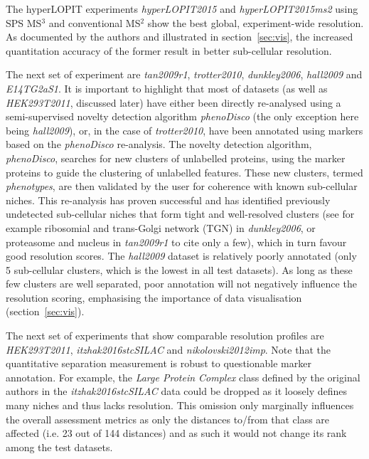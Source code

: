 \documentclass[12pt]{article}\usepackage[]{graphicx}\usepackage[]{color}
\begin{document}
The hyperLOPIT experiments \textit{hyperLOPIT2015} and
\textit{hyperLOPIT2015ms2} \citep{Christoforou:2016} using SPS MS$^3$
and conventional MS$^2$ show the best global, experiment-wide
resolution. As documented by the authors and illustrated in
section~\ref{sec:vis}, the increased quantitation accuracy of the
former result in better sub-cellular resolution.

The next set of experiment are \textit{tan2009r1},
\textit{trotter2010}, \textit{dunkley2006}, \textit{hall2009} and
\textit{E14TG2aS1}. It is important to highlight that most of datasets
(as well as \textit{HEK293T2011}, discussed later) have either been
directly re-analysed using a semi-supervised novelty detection
algorithm \textit{phenoDisco} \citep{Breckels:2013} (the only
exception here being \textit{hall2009}), or, in the case of
\textit{trotter2010}, have been annotated using markers based on the
\textit{phenoDisco} re-analysis. The novelty detection algorithm,
\textit{phenoDisco}, searches for new clusters of unlabelled proteins,
using the marker proteins to guide the clustering of unlabelled
features. These new clusters, termed \textit{phenotypes}, are then
validated by the user for coherence with known sub-cellular niches.
This re-analysis has proven successful \citep{Breckels:2013} and has
identified previously undetected sub-cellular niches that form tight
and well-resolved clusters (see for example ribosomial and trans-Golgi
network (TGN) in \textit{dunkley2006}, or proteasome and nucleus in
\textit{tan2009r1} to cite only a few), which in turn favour good
resolution scores. The \textit{hall2009} dataset is relatively poorly
annotated (only 5 sub-cellular clusters, which is the lowest in all
test datasets). As long as these few clusters are well separated, poor
annotation will not negatively influence the resolution scoring,
emphasising the importance of data visualisation
(section~\ref{sec:vis}).



The next set of experiments that show comparable resolution profiles
are \textit{HEK293T2011}, \textit{itzhak2016stcSILAC} and
\textit{nikolovski2012imp}. Note that the quantitative separation
measurement is robust to questionable marker annotation. For example,
the \textit{Large Protein Complex} class defined by the original
authors in the \textit{itzhak2016stcSILAC} data could be dropped as it
loosely defines many niches and thus lacks resolution. This omission only
marginally influences the overall assessment metrics as only the
distances to/from that class are affected (i.e. 23
out of 144 distances) and as such it would not change its
rank among the test datasets.
\end{document}
